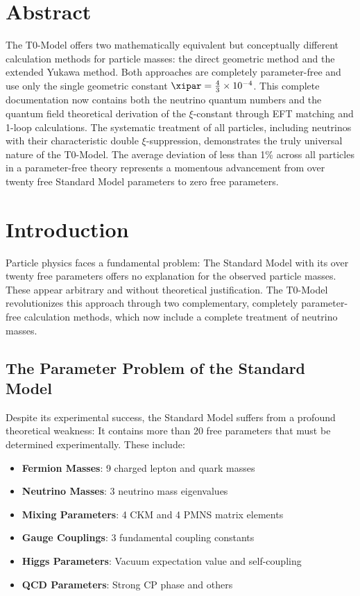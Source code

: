 	\section*{Abstract}
	The T0-Model offers two mathematically equivalent but conceptually different calculation methods for particle masses: the direct geometric method and the extended Yukawa method. Both approaches are completely parameter-free and use only the single geometric constant $\xipar = \frac{4}{3} \times 10^{-4}$. This complete documentation now contains both the neutrino quantum numbers and the quantum field theoretical derivation of the $\xi$-constant through EFT matching and 1-loop calculations. The systematic treatment of all particles, including neutrinos with their characteristic double $\xi$-suppression, demonstrates the truly universal nature of the T0-Model. The average deviation of less than 1\% across all particles in a parameter-free theory represents a momentous advancement from over twenty free Standard Model parameters to zero free parameters.

	
	\section{Introduction}
	\label{sec:introduction}
	
	Particle physics faces a fundamental problem: The Standard Model with its over twenty free parameters offers no explanation for the observed particle masses. These appear arbitrary and without theoretical justification. The T0-Model revolutionizes this approach through two complementary, completely parameter-free calculation methods, which now include a complete treatment of neutrino masses.
	
	\subsection{The Parameter Problem of the Standard Model}
	\label{subsec:parameter_problem}
	
	Despite its experimental success, the Standard Model suffers from a profound theoretical weakness: It contains more than 20 free parameters that must be determined experimentally. These include:
	
	\begin{itemize}
		\item \textbf{Fermion Masses}: 9 charged lepton and quark masses
		\item \textbf{Neutrino Masses}: 3 neutrino mass eigenvalues
		\item \textbf{Mixing Parameters}: 4 CKM and 4 PMNS matrix elements
		\item \textbf{Gauge Couplings}: 3 fundamental coupling constants
		\item \textbf{Higgs Parameters}: Vacuum expectation value and self-coupling
		\item \textbf{QCD Parameters}: Strong CP phase and others
	\end{itemize}
	
